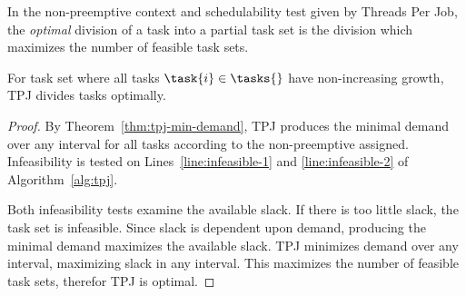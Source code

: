 In the non-preemptive context and schedulability test given by Threads
Per Job, the \emph{optimal} division of a task into a partial task set
is the division which maximizes the number of feasible task sets. 

\begin{theorem}
  For task set \tasks{} where all tasks ${\task{i} \in \tasks{}}$
  have non-increasing growth, TPJ divides tasks optimally. 

  \begin{proof} By Theorem~\ref{thm:tpj-min-demand}, TPJ produces the
    minimal demand over any interval for all tasks according to the
    non-preemptive assigned. Infeasibility is tested on
    Lines~\ref{line:infeasible-1} and \ref{line:infeasible-2} of
    Algorithm~\ref{alg:tpj}.

    Both infeasibility tests examine the available slack. If there is
    too little slack, the task set is infeasible. Since slack is
    dependent upon demand, producing the minimal demand maximizes the
    available slack. TPJ minimizes demand over any interval,
    maximizing slack in any interval. This maximizes the number of
    feasible task sets, therefor TPJ is optimal.%
  \end{proof}
\end{theorem}
